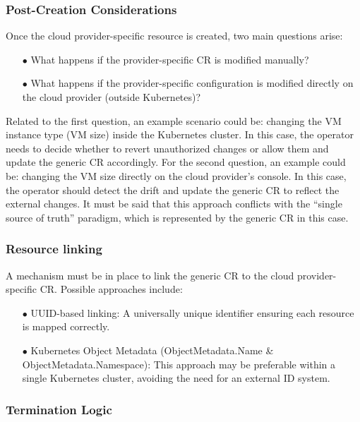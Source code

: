 \subsubsection{Post-Creation Considerations}

Once the cloud provider-specific resource is created, two main questions arise:
\begin{itemize}[itemsep=0.2pt, topsep=1pt]
  \item[$\bullet$] What happens if the provider-specific CR is modified manually?
  \item[$\bullet$] What happens if the provider-specific configuration is modified directly on the cloud provider (outside Kubernetes)?
\end{itemize}

Related to the first question, an example scenario could be: changing the VM instance type (VM size) inside the Kubernetes cluster. 
In this case, the operator needs to decide whether to revert unauthorized changes or allow them and update the generic CR accordingly.
For the second question, an example could be: changing the VM size directly on the cloud provider’s console. 
In this case, the operator should detect the drift and update the generic CR to reflect the external changes.
It must be said that this approach conflicts with the ``single source of truth'' paradigm, which is represented by the generic CR in this case.

\subsubsection{Resource linking}

A mechanism must be in place to link the generic CR to the cloud provider-specific CR. 
Possible approaches include:
\begin{itemize}[itemsep=0.2pt, topsep=1pt]
  \item[$\bullet$] UUID-based linking: A universally unique identifier ensuring each resource is mapped correctly.
  \item[$\bullet$] Kubernetes Object Metadata (ObjectMetadata.Name \& ObjectMetadata.Namespace): This approach may be preferable within a single Kubernetes cluster, avoiding the need for an external ID system.
\end{itemize}

\subsubsection{Termination Logic}


